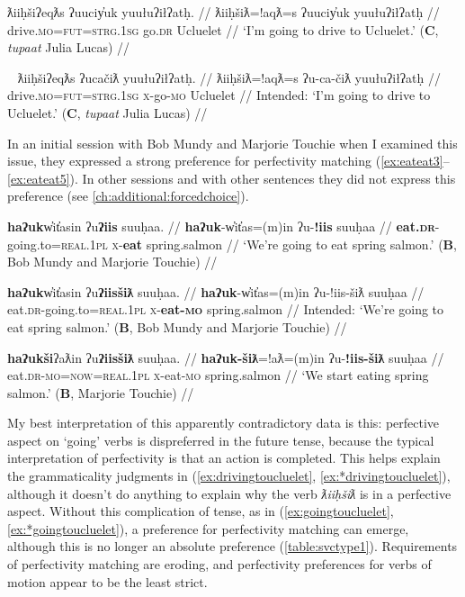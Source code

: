 \ex \label{ex:drivingtoucluelet}
\begingl
\glpreamble ƛiiḥšiʔeqƛs ʔuuciy̓uk yuułuʔiłʔatḥ. //
\gla ƛiiḥšiƛ=!aqƛ=s ʔuuciy̓uk yuułuʔiłʔatḥ //
\glb drive.\textsc{mo}=\textsc{fut}=\textsc{strg.1sg} go.\textsc{dr} Ucluelet //
\glft `I'm going to drive to Ucluelet.' (\textbf{C}, \textit{tupaat} Julia Lucas) //
\endgl
\xe

\ex~ \label{ex:*drivingtoucluelet}
\begingl
\glpreamble *ƛiiḥšiʔeqƛs ʔucačiƛ yuułuʔiłʔatḥ. //
\gla ƛiiḥšiƛ=!aqƛ=s ʔu-ca-čiƛ yuułuʔiłʔatḥ //
\glb drive.\textsc{mo}=\textsc{fut}=\textsc{strg.1sg} \textsc{x}-go-\textsc{mo} Ucluelet //
\glft Intended: `I'm going to drive to Ucluelet.' (\textbf{C}, \textit{tupaat} Julia Lucas) //
\endgl
\xe

In an initial session with Bob Mundy and Marjorie Touchie when I examined this issue, they expressed a strong preference for perfectivity matching (\ref{ex:eateat3}--\ref{ex:eateat5}). In other sessions and with other sentences they did not express this preference (see \cref{ch:additional:forcedchoice}).

\ex \label{ex:eateat3}
\begingl
\glpreamble \textbf{haʔuk}w̓it̓asin ʔu\textbf{ʔiis} suuḥaa. //
\gla \textbf{haʔuk}-w̓it̓as=(m)in ʔu-\textbf{!iis} suuḥaa //
\glb \textbf{eat.\textsc{dr}}-going.to=\textsc{real.1pl} \textsc{x}-\textbf{eat} spring.salmon //
\glft `We're going to eat spring salmon.' (\textbf{B}, Bob Mundy and Marjorie Touchie) //
\endgl
\xe

\ex \label{ex:*eateat4}
\begingl
\glpreamble *\textbf{haʔuk}w̓it̓asin ʔu\textbf{ʔiisšiƛ} suuḥaa. //
\gla \textbf{haʔuk}-w̓it̓as=(m)in ʔu-!iis-šiƛ suuḥaa //
\glb eat.\textsc{dr}-going.to=\textsc{real.1pl} \textsc{x}-\textbf{eat-\textsc{mo}} spring.salmon //
\glft Intended: `We're going to eat spring salmon.' (\textbf{B}, Bob Mundy and Marjorie Touchie) //
\endgl
\xe

\ex \label{ex:eateat5}
\begingl
\glpreamble \textbf{haʔukši}ʔaƛin ʔu\textbf{ʔiisšiƛ} suuḥaa. //
\gla \textbf{haʔuk-šiƛ}=!aƛ=(m)in ʔu-\textbf{!iis-šiƛ} suuḥaa //
\glb eat.\textsc{dr}-\textsc{mo}=\textsc{now}=\textsc{real.1pl} \textsc{x}-eat-\textsc{mo} spring.salmon //
\glft `We start eating spring salmon.' (\textbf{B}, Marjorie Touchie) //
\endgl
\xe

My best interpretation of this apparently contradictory data is this: perfective aspect on `going' verbs is dispreferred in the future tense, because the typical interpretation of perfectivity is that an action is completed. This helps explain the grammaticality judgments in (\ref{ex:drivingtoucluelet}, \ref{ex:*drivingtoucluelet}), although it doesn't do anything to explain why the verb \textit{ƛiiḥšiƛ} is in a perfective aspect. Without this complication of tense, as in (\ref{ex:goingtoucluelet}, \ref{ex:*goingtoucluelet}), a preference for perfectivity matching can emerge, although this is no longer an absolute preference (\cref{table:svctype1}). Requirements of perfectivity matching are eroding, and perfectivity preferences for verbs of motion appear to be the least strict.

